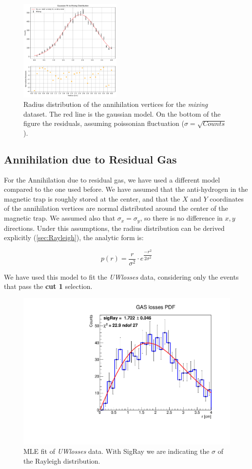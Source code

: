 \documentclass[11pt,a4paper,twocolumn]{article}
\begin{document}
\begin{figure}[hbtp]
\includegraphics[width = 0.45\textwidth]{../PlotMLEfit/SingleModel/GaussianFitMixing.pdf}
\caption{Radius distribution of the annihilation vertices for the \textit{mixing} dataset. The red line is the gaussian model. On the bottom of the figure the residuals, assuming poissonian fluctuation ($\sigma = \sqrt{Counts}$).}
\label{fig:MixingFit}
\end{figure}

\subsection*{Annihilation due to Residual Gas}

For the Annihilation due to residual gas, we have used a different model compared to the one used before. We have assumed that the anti-hydrogen in the magnetic trap is roughly stored at the center, and that the $X$ and $Y$ coordinates of the annihilation vertices are normal distributed around the center of the magnetic trap. We assumed also that $\sigma_{x} = \sigma_{y}$, so there is no difference in $x,y$ directions. Under this assumptions, the radius distribution can be derived explicitly (\ref{sec:Rayleigh}), the analytic form is:

\begin{equation}
p(r) = \frac{r}{\sigma^{2}} \cdot  e^{ \dfrac{- r^{2}}{ 2 \sigma^{2}}}
\end{equation}

We have used this model to fit the \textit{UWlosses} data, considering only the events that pass the \textbf{cut 1} selection.
\begin{figure}[hbtp]

\centering
\includegraphics[width = .5\textwidth]{../PlotMLEfit/SingleModel/FitToUw.pdf}
\caption{ MLE fit of \textit{UWlosses} data. With SigRay we are indicating the $\sigma$ of the Rayleigh distribution.}
\end{figure}
\end{document}
